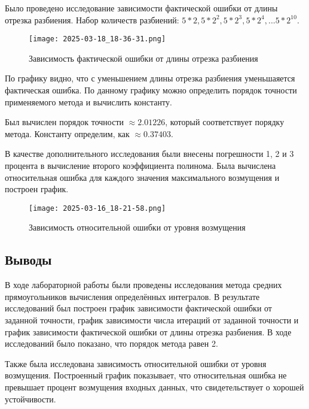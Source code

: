 \documentclass[12pt]{article}
\begin{document}
Было проведено исследование зависимости фактической ошибки от длины отрезка разбиения. Набор количеств разбиений: $5 * 2, 5 * 2^2, 5 * 2^3, 5 * 2^4, ... 5 * 2^{10}$.


\begin{figure}[H]
    \centering
    \texttt{[image: 2025-03-18\_18-36-31.png]}
    \caption{Зависимость фактической ошибки от длины отрезка разбиения}
    \label{fig:enter-label}
\end{figure}

По графику видно, что с уменьшением длины отрезка разбиения уменьшаяется фактическая ошибка. По данному графику можно определить порядок точности применяемого метода и вычислить константу.

Был вычислен порядок точности $\approx2.01226$, который соответствует порядку метода. Константу определим, как $\approx0.37403$.

В качестве дополнительного исследования были внесены погрешности 1, 2 и 3 процента в вычисление второго коэффициента полинома. Была вычислена относительная ошибка для каждого значения максимального возмущения и построен график.

\begin{figure}[H]
    \centering
    \texttt{[image: 2025-03-16\_18-21-58.png]}
    \caption{Зависимость относительной ошибки от уровня возмущения}
    \label{fig:enter-label}
\end{figure}

\begin{center}
    \section{Выводы}
\end{center}

В ходе лабораторной работы были проведены исследования метода средних прямоугольников вычисления определённых интегралов. В результате исследований был построен график зависимости фактической ошибки от заданной точности, график зависимости числа итераций от заданной точности и график зависимости фактической ошибки от длины отрезка разбиения. В ходе исследований было показано, что порядок метода равен 2.

Также была исследована зависимость относительной ошибки от уровня возмущения. Построенный график показывает, что относительная ошибка не превышает процент возмущения входных данных, что свидетельствует о хорошей устойчивости.
\end{document}
